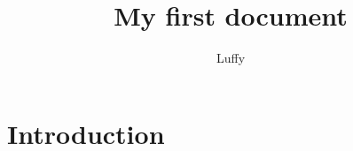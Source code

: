 \documentclass{article}
\title{My first document}
\author{Luffy}
\begin{document}
	\maketitle
	\section{Introduction}
\end{document}
